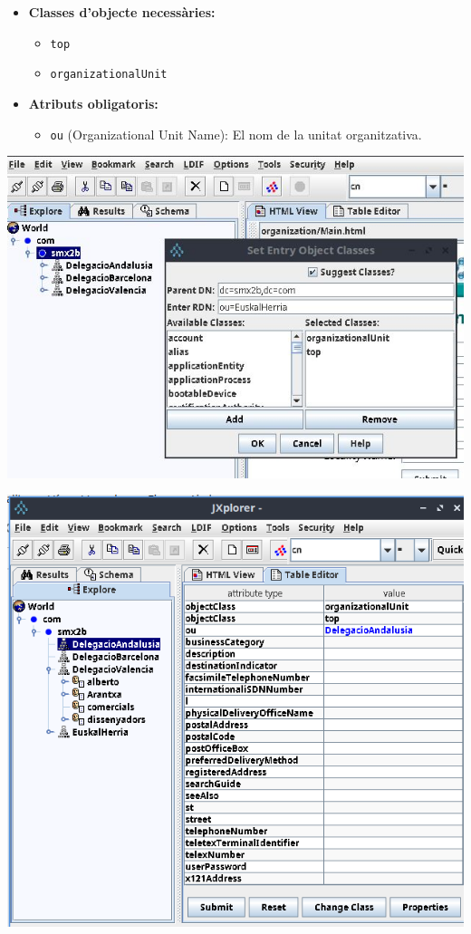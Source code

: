 \documentclass[
  12 pt,
  a4paper,
]{article}
\providecommand{\tightlist}{%
  \setlength{\itemsep}{0pt}\setlength{\parskip}{0pt}}
\begin{document}
\begin{itemize}
\tightlist
\item
  \textbf{Classes d'objecte necessàries:}

  \begin{itemize}
  \tightlist
  \item
    \texttt{top}
  \item
    \texttt{organizationalUnit}
  \end{itemize}
\item
  \textbf{Atributs obligatoris:}

  \begin{itemize}
  \tightlist
  \item
    \texttt{ou} (Organizational Unit Name): El nom de la unitat
    organitzativa.
  \end{itemize}
\end{itemize}

\includegraphics{png/jxplorerNovaOU.jpg}

\includegraphics{png/atributsOU.png}
\end{document}
